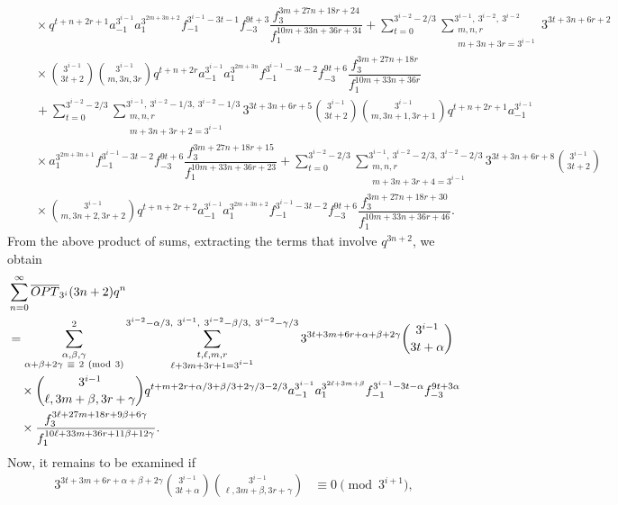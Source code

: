 \documentclass[12pt,reqno]{amsart}
\numberwithin{equation}{section}
\begin{document}
\begin{align*}
         &\quad\times q^{t+n+2r+1}a_{-1}^{3^{i-1}}a_{1}^{3^{2m+3n+2}}f_{-1}^{3^{i-1}-3t-1}f_{-3}^{9t+3}  \dfrac{f_3^{3m+27n+18r+24}}{f_1^{10m+33n+36r+34}}+
         \sum_{t=0}^{3^{i-2}-2/3}\sum_{\substack{m,n,r\\m+3n+3r=3^{i-1}}}^{3^{i-1},~ 3^{i-2},~ 3^{i-2}}  3^{3t+3n+6r+2}\\
         &\quad\times\binom{3^{i-1}}{3t+2}\binom{3^{i-1}}{m,3n,3r} q^{t+n+2r}a_{-1}^{3^{i-1}}  a_{1}^{3^{2m+3n}}f_{-1}^{3^{i-1}-3t-2}f_{-3}^{9t+6} \dfrac{f_3^{3m+27n+18r}}{f_1^{10m+33n+36r}} \\
         &\quad+\sum_{t=0}^{3^{i-2}-2/3}\sum_{\substack{m,n,r\\m+3n+3r+2=3^{i-1}}}^{3^{i-1},~ 3^{i-2}-1/3,~ 3^{i-2}-1/3} 3^{3t+3n+6r+5}\binom{3^{i-1}}{3t+2} \binom{3^{i-1}}{m,3n+1,3r+1} q^{t+n+2r+1}a_{-1}^{3^{i-1}}  \\
         &\quad\times a_{1}^{3^{2m+3n+1}}f_{-1}^{3^{i-1}-3t-2}f_{-3}^{9t+6}\dfrac{f_3^{3m+27n+18r+15}}{f_1^{10m+33n+36r+23}}+\sum_{t=0}^{3^{i-2}-2/3}\sum_{\substack{m,n,r\\m+3n+3r+4=3^{i-1}}}^{3^{i-1},~ 3^{i-2}-2/3,~ 3^{i-2}-2/3} 3^{3t+3n+6r+8}\binom{3^{i-1}}{3t+2}\\
         &\quad\times\binom{3^{i-1}}{m,3n+2,3r+2} q^{t+n+2r+2}a_{-1}^{3^{i-1}}  a_{1}^{3^{2m+3n+2}}f_{-1}^{3^{i-1}-3t-2}f_{-3}^{9t+6}\dfrac{f_3^{3m+27n+18r+30}}{f_1^{10m+33n+36r+46}}.
    \end{align*}
    \fi
 From the above product of sums, extracting the terms that involve $q^{3n+2}$, we obtain
\begin{align}
         &\sum_{n=0}^\infty \overline{OPT}_{3^i}(3n+2)q^{n}\notag\\
         &= \sum_{\substack{\alpha,\beta,\gamma\\ \alpha+\beta+2\gamma~\equiv~ 2~(\textup{mod}~3)}}^{2}\sum_{\substack{t, \ell,m,r\\ \ell+3m+3r+1=3^{i-1}}}^{3^{i-2}-\alpha/3,~3^{i-1},~ 3^{i-2}-\beta/3,~ 3^{i-2}-\gamma/3} 3^{3t+3m+6r+\alpha+\beta+2\gamma} \binom{3^{i-1}}{3t+\alpha}\notag\\
         &\quad\times \binom{3^{i-1}}{\ell,3m+\beta,3r+\gamma}q^{t+m+2r+\alpha/3+\beta/3+2\gamma/3-2/3}a_{-1}^{3^{i-1}} a_{1}^{3^{2\ell+3m+\beta}}f_{-1}^{3^{i-1}-3t-\alpha}f_{-3}^{9t+3\alpha} \notag\\
         &\quad\times\dfrac{f_3^{3\ell+27m+18r+9\beta+6\gamma}}{f_1^{10\ell+33m+36r+11\beta+12\gamma}}.\label{OPT3i:3n+2}
\end{align}
Now, it remains to be examined if
\begin{align}
    3^{3t+3m+6r+\alpha+\beta+2\gamma}\binom{3^{i-1}}{3t+\alpha}\binom{3^{i-1}}{\ell,3m+\beta,3r+\gamma}&\equiv0\pmod{3^{i+1}},\label{Mixed:KSV}
\end{align}
\end{document}
